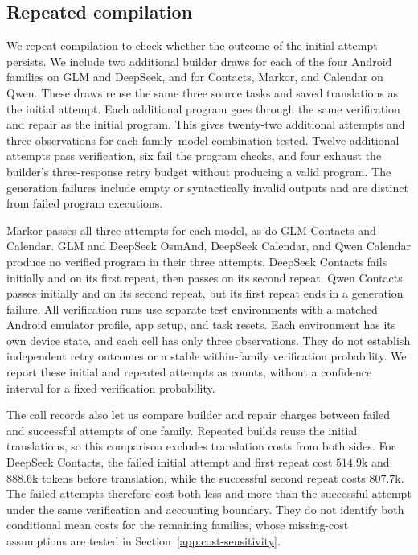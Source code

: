 \subsection{Repeated compilation}\label{app:measurement-checks}

We repeat compilation to check whether the outcome of the initial attempt persists.
We include two additional builder draws for each of the four Android families on GLM and DeepSeek, and for Contacts, Markor, and Calendar on Qwen.
These draws reuse the same three source tasks and saved translations as the initial attempt.
Each additional program goes through the same verification and repair as the initial program.
This gives twenty-two additional attempts and three observations for each family--model combination tested.
Twelve additional attempts pass verification, six fail the program checks, and four exhaust the builder's three-response retry budget without producing a valid program.
The generation failures include empty or syntactically invalid outputs and are distinct from failed program executions.



Markor passes all three attempts for each model, as do GLM Contacts and Calendar.
GLM and DeepSeek OsmAnd, DeepSeek Calendar, and Qwen Calendar produce no verified program in their three attempts.
DeepSeek Contacts fails initially and on its first repeat, then passes on its second repeat.
Qwen Contacts passes initially and on its second repeat, but its first repeat ends in a generation failure.
All verification runs use separate test environments with a matched Android emulator profile, app setup, and task resets.
Each environment has its own device state, and each cell has only three observations.
They do not establish independent retry outcomes or a stable within-family verification probability.
We report these initial and repeated attempts as counts, without a confidence interval for a fixed verification probability.

The call records also let us compare builder and repair charges between failed and successful attempts of one family.
Repeated builds reuse the initial translations, so this comparison excludes translation costs from both sides.
For DeepSeek Contacts, the failed initial attempt and first repeat cost $514.9$k and $888.6$k tokens before translation, while the successful second repeat costs $807.7$k.
The failed attempts therefore cost both less and more than the successful attempt under the same verification and accounting boundary.
They do not identify both conditional mean costs for the remaining families, whose missing-cost assumptions are tested in Section~\ref{app:cost-sensitivity}.

